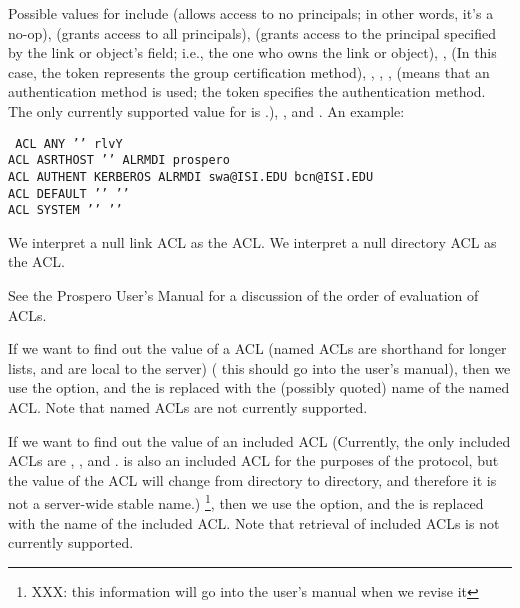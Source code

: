 Possible values for  include  (allows
access to no principals; in other words, it's a no-op), 
(grants access to all 
principals),  (grants access to the principal specified by
the link or object's  field; i.e., the one who owns the
link or object),  
, %
 (In this case, the  token
represents the group certification method),
, , ,  (means
that an 
authentication method is used; the  token
specifies the 
authentication method.  The only currently supported value for
 is .),  , and
.  An example:  
\begin{command}
\tt
ACL ANY '{}' rlvY \\
ACL ASRTHOST '{}' ALRMDI prospero \\
ACL AUTHENT KERBEROS ALRMDI swa@ISI.EDU bcn@ISI.EDU \\
ACL DEFAULT '{}' '{}' \\
ACL SYSTEM '{}' '{}' \\
\end{command}

We interpret a null link ACL as the  ACL.  
We interpret a null directory ACL as the  ACL.

See the Prospero User's Manual for a discussion of the order of
evaluation of ACLs.

If we want to find out the value of a  ACL (named ACLs are
shorthand for longer lists, and are local to the server) ( this
should go into the user's manual), then we use
the  option, and the 
 is replaced with the (possibly quoted) name
of the named ACL.   Note that named ACLs are not currently supported.

If we want to find out the value of an included ACL (Currently, the
only included ACLs are , , and .   is
also an included ACL for the purposes of the protocol, but the value
of the  ACL will change from directory to directory, and
therefore it is not a server-wide stable name.) \footnote{XXX: this
information will go into the user's manual when we revise it}, then we use
the  option, and the 
 is replaced with the name
of the included ACL.   Note that retrieval of included ACLs is not
currently supported. 

